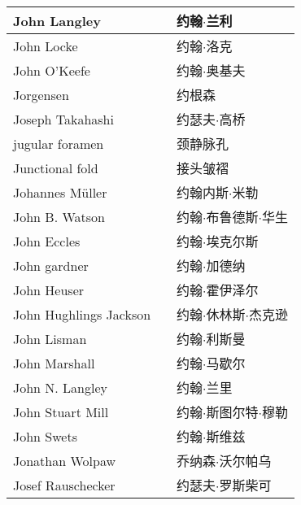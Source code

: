 \begin{longtable}{lll}
	\midrule
	John Langley   && 约翰$\cdot$兰利  \\
	
	\midrule
	John Locke   && 约翰$\cdot$洛克  \\
	
	\midrule
	John O’Keefe   && 约翰$\cdot$奥基夫  \\
	
	\midrule
	Jorgensen   && 约根森  \\
	
	\midrule
	Joseph Takahashi   && 约瑟夫$\cdot$高桥  \\
	
	\midrule
	jugular foramen   && 颈静脉孔  \\
	
	\midrule
	Junctional fold   && 接头皱褶  \\
	
	\midrule
	Johannes Müller   && 约翰内斯$\cdot$米勒  \\
	
	\midrule
	John B. Watson   && 约翰$\cdot$布鲁德斯$\cdot$华生  \\
	
	\midrule
	John Eccles   && 约翰$\cdot$埃克尔斯  \\
	
	\midrule
	John gardner   && 约翰$\cdot$加德纳  \\
	
	\midrule
	John Heuser   && 约翰$\cdot$霍伊泽尔  \\
	
	\midrule
	John Hughlings Jackson   && 约翰$\cdot$休林斯$\cdot$杰克逊  \\
	
	\midrule
	John Lisman   && 约翰$\cdot$利斯曼  \\
	
	\midrule
	John Marshall   && 约翰$\cdot$马歇尔  \\
	
	\midrule
	John N. Langley   && 约翰$\cdot$兰里  \\
	
	\midrule
	John Stuart Mill   && 约翰$\cdot$斯图尔特$\cdot$穆勒  \\
	
	\midrule
	John Swets   && 约翰$\cdot$斯维兹  \\
	
	\midrule
	Jonathan Wolpaw   && 乔纳森$\cdot$沃尔帕乌  \\
	
	\midrule
	Josef Rauschecker   && 约瑟夫$\cdot$罗斯柴可  \\
	

\end{longtable}
